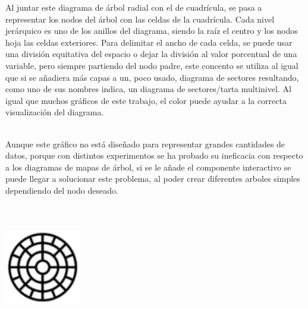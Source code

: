 \documentclass{article}\usepackage[]{graphicx}\usepackage[]{color}
\begin{document}
Al juntar este diagrama de \'arbol radial con el de cuadr\'icula, se pasa a representar los nodos del \'arbol con las celdas de la cuadr\'icula. Cada nivel jer\'arquico es uno de los anillos del diagrama, siendo la ra\'iz el centro y los nodos hoja las celdas exteriores. Para delimitar el ancho de cada celda, se puede usar una divisi\'on equitativa del espacio o dejar la divisi\'on al valor porcentual de una variable, pero siempre partiendo del nodo padre, este concento se utiliza al igual que si se a\~nadiera m\'as capas a un, poco usado, diagrama de sectores resultando, como uno de sus nombres indica, un diagrama de sectores/tarta multinivel\cite{multi-pie}. Al igual que muchos gr\'aficos de este trabajo, el color puede ayudar a la correcta visualizaci\'on del diagrama.~\\~\par
Aunque este gr\'afico no est\'a dise\~nado para representar grandes cantidades de datos, porque con distintos experimentos se ha probado su ineficacia con respecto a los diagramas de mapas de \'arbol\cite{rayos-vs-tree}\cite{rayos}, si se le a\~nade el componente interactivo se puede llegar a solucionar este problema, al poder crear diferentes arboles simples dependiendo del nodo deseado\cite{rayos-inte}\cite{rayos-intera}.
~\\~\\~\\~\\
\vbox{
    \centering
    \includegraphics[width=0.25\textwidth]{imag/rayos}
}
\clearpage
\end{document}
